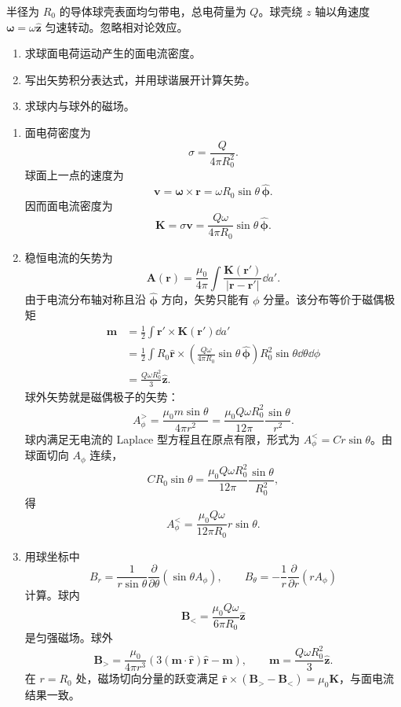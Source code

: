 \begin{question}[均匀带电旋转球壳的稳恒磁场]
半径为 $R_0$ 的导体球壳表面均匀带电，总电荷量为 $Q$。球壳绕 $z$ 轴以角速度 $\boldsymbol\omega=\omega\hat{\mathbf z}$ 匀速转动。忽略相对论效应。
\begin{enumerate}
  \item 求球面电荷运动产生的面电流密度。
  \item 写出矢势积分表达式，并用球谐展开计算矢势。
  \item 求球内与球外的磁场。
\end{enumerate}
\begin{solution}
\begin{enumerate}
  \item 面电荷密度为
  \[
    \sigma=\frac{Q}{4\pi R_0^2} .
  \]
  球面上一点的速度为
  \[
    \mathbf v=\boldsymbol\omega\times\mathbf r
    =\omega R_0\sin\theta\,\hat{\boldsymbol\phi} .
  \]
  因而面电流密度为
  \[
    \boxed{\mathbf K=\sigma\mathbf v
    =\frac{Q\omega}{4\pi R_0}\sin\theta\,\hat{\boldsymbol\phi}} .
  \]

  \item 稳恒电流的矢势为
  \[
    \mathbf A(\mathbf r)=\frac{\mu_0}{4\pi}\int
    \frac{\mathbf K(\mathbf r')}{|\mathbf r-\mathbf r'|}\dd{a'} .
  \]
  由于电流分布轴对称且沿 $\hat{\boldsymbol\phi}$ 方向，矢势只能有 $\phi$ 分量。该分布等价于磁偶极矩
  \[
  \begin{aligned}
    \mathbf m&=\frac12\int \mathbf r'\times\mathbf K(\mathbf r')\dd{a'} \\
    &=\frac12\int R_0\hat{\mathbf r}\times
      \left(\frac{Q\omega}{4\pi R_0}\sin\theta\,\hat{\boldsymbol\phi}\right)
      R_0^2\sin\theta\dd{\theta}\dd{\phi} \\
    &=\frac{Q\omega R_0^2}{3}\hat{\mathbf z} .
  \end{aligned}
  \]
  球外矢势就是磁偶极子的矢势：
  \[
    \boxed{A_\phi^{>}=\frac{\mu_0m\sin\theta}{4\pi r^2}
    =\frac{\mu_0Q\omega R_0^2}{12\pi}\frac{\sin\theta}{r^2}} .
  \]
  球内满足无电流的 Laplace 型方程且在原点有限，形式为 $A_\phi^{<}=Cr\sin\theta$。由球面切向 $A_\phi$ 连续，
  \[
    CR_0\sin\theta=\frac{\mu_0Q\omega R_0^2}{12\pi}\frac{\sin\theta}{R_0^2},
  \]
  得
  \[
    \boxed{A_\phi^{<}=\frac{\mu_0Q\omega}{12\pi R_0}r\sin\theta} .
  \]

  \item 用球坐标中
  \[
    B_r=\frac{1}{r\sin\theta}\frac{\partial}{\partial\theta}(\sin\theta A_\phi),
    \qquad
    B_\theta=-\frac1r\frac{\partial}{\partial r}(rA_\phi)
  \]
  计算。球内
  \[
    \boxed{\mathbf B_< = \frac{\mu_0Q\omega}{6\pi R_0}\hat{\mathbf z}}
  \]
  是匀强磁场。球外
  \[
    \boxed{\mathbf B_>
    =\frac{\mu_0}{4\pi r^3}\left(3(\mathbf m\cdot\hat{\mathbf r})\hat{\mathbf r}-\mathbf m\right),
    \qquad
    \mathbf m=\frac{Q\omega R_0^2}{3}\hat{\mathbf z}} .
  \]
  在 $r=R_0$ 处，磁场切向分量的跃变满足 $\hat{\mathbf r}\times(\mathbf B_>-\mathbf B_<)=\mu_0\mathbf K$，与面电流结果一致。
\end{enumerate}
\end{solution}
\end{question}


